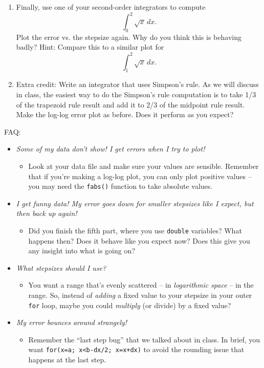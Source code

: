 \documentclass[12pt]{article}
\begin{document}
\begin{enumerate}
\item{Finally, use one of your second-order integrators to compute $$\int_0^2 \sqrt{x}\,dx.$$ Plot the error vs. the stepsize again. Why do you think this is behaving badly?
  Hint: Compare this to a similar plot for $$\int_1^2 \sqrt{x}\,dx.$$}

\item{Extra credit: Write an integrator that uses Simpson's rule. As we will discuss in class, the easiest way to do the Simpson's rule computation is to take 1/3 of the trapezoid
  rule result and add it to 2/3 of the midpoint rule result. Make the log-log error plot as before. Does it perform as you expect?}
  \end{enumerate} 


FAQ:

\begin{itemize}

\item {\it Some of my data don't show! I get errors when I try to plot!}

\begin{itemize}
\item Look at your data file and make sure your values are sensible. Remember that if you're making a log-log plot, you can only plot positive values -- you may need the {\tt fabs()} function to take absolute values.
\end{itemize}

\item {\it I get funny data! My error goes down for smaller stepsizes like I expect, but then back up again!} 

\begin{itemize}
\item Did you finish the fifth part, where you use {\tt double} variables? What happens then? Does it behave like you expect now? Does this give you any insight into what is going on?
\end{itemize}
\item {\it What stepsizes should I use?} 

\begin{itemize}
\item You want a range that's evenly scattered -- in {\it logarithmic space} -- in the range. So, instead of {\it adding} a fixed value to your stepsize in your outer {\tt for} loop, maybe you could {\it multiply} (or divide) by a fixed value?
\end{itemize}
\item {\it My error bounces around strangely!} 

\begin{itemize}
\item Remember the ``last step bug'' that we talked about in class. In brief, you want {\tt for(x=a; x<b-dx/2; x=x+dx)} to avoid the rounding issue that happens at the last step.
\end{itemize}
\end{itemize}
\end{document}
